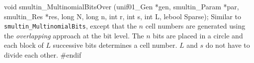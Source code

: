 void smultin_MultinomialBitsOver (unif01_Gen *gen, smultin_Param *par,
   smultin_Res *res, long N, long n, int r, int s, int L, lebool Sparse);
\endcode
 \tab
  Similar to {\tt smultin\_MultinomialBits}, except that the $n$ cell
  numbers are generated using the {\em overlapping\/} approach at the 
  bit level.  The $n$ bits are placed in a circle and each block of $L$
  successive bits determines a cell number.
  $L$ and $s$ do not have to divide each other.
 \endtab
\code
\hide
#endif
\endhide
\endcode
